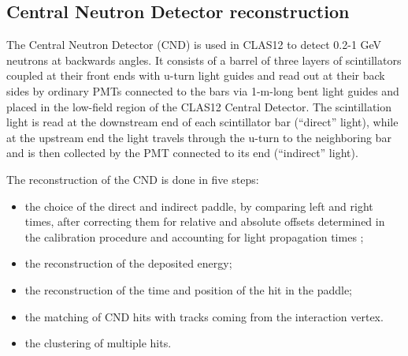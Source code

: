 \subsection{Central Neutron Detector reconstruction}\label{sec_rec_cnd}
The Central Neutron Detector (CND) is used in CLAS12 to detect 0.2-1 GeV neutrons at backwards angles. It consists of a barrel of three layers of scintillators coupled at their front ends with u-turn light guides and read out at their back sides by ordinary PMTs connected to the bars via 1-m-long bent light guides and placed in the low-field region of the CLAS12 Central Detector.
The scintillation light is read at the downstream end of each scintillator bar (``direct'' light), while at the upstream end the light travels through the u-turn to the neighboring bar and is then collected by the PMT connected to its end (``indirect'' light). 

The reconstruction of the CND is done in five steps:
\begin{itemize}
\item{the choice of the direct and indirect paddle, by comparing left and right times, after correcting them for relative and absolute offsets determined in the calibration procedure and accounting for light propagation times \cite{cnd-nim};}
\item{the reconstruction of the deposited energy;}
\item{the reconstruction of the time and position of the hit in the paddle;}
\item{the matching of CND hits with tracks coming from the interaction vertex.}
\item{the clustering of multiple hits.}
\end{itemize}

